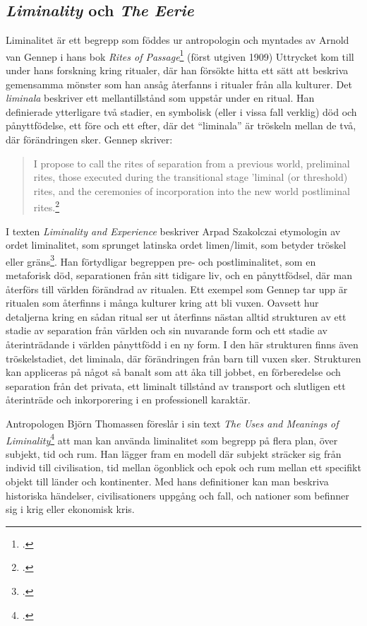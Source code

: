 \documentclass{article}
\begin{document}
\subsection{\emph{Liminality} och \emph{The Eerie}}
Liminalitet är ett begrepp som föddes ur antropologin och myntades av Arnold van Gennep i hans bok \emph{Rites
of Passage}\footcite{Gennep} (först utgiven 1909) Uttrycket kom till under hans forskning kring ritualer, där
han försökte hitta ett sätt att beskriva gemensamma mönster som han ansåg återfanns i ritualer från alla
kulturer. Det \emph{liminala} beskriver ett mellantillstånd som uppstår under en ritual. Han definierade ytterligare
två stadier, en symbolisk (eller i vissa fall verklig) död och pånyttfödelse, ett före och ett efter, där det
``liminala'' är tröskeln mellan de två, där förändringen sker. Gennep skriver:

\begin{quote}
I propose to call the rites of separation from a previous world, preliminal rites, those executed during the
transitional stage 'liminal (or threshold) rites, and the ceremonies of incorporation into the new world
	postliminal rites.\footcite[21]{Gennep}
\end{quote}


I texten \emph{Liminality and Experience} beskriver Arpad Szakolczai etymologin av ordet liminalitet, som
sprunget latinska ordet limen/limit, som betyder tröskel eller gräns\footcite[147-148]{Arpad}. 
Han förtydligar begreppen pre- och postliminalitet, som en metaforisk död, separationen från sitt tidigare
liv, och en pånyttfödsel, där man återförs till världen förändrad av ritualen. Ett exempel som Gennep tar upp
är ritualen som återfinns i många kulturer kring att bli vuxen. Oavsett hur detaljerna kring en sådan ritual
ser ut återfinns nästan alltid strukturen av ett stadie av separation från världen och sin nuvarande form och
ett stadie av återinträdande i världen pånyttfödd i en ny form. I den här strukturen finns även
tröskelstadiet, det liminala, där förändringen från barn till vuxen sker. Strukturen kan appliceras på något
så banalt som att åka till jobbet, en förberedelse och separation från det privata, ett liminalt tillstånd av
transport och slutligen ett återinträde och inkorporering i en professionell karaktär. 

Antropologen Björn Thomassen föreslår i sin text \emph{The Uses and Meanings of
Liminality}\footcite[12-13]{Thomassen} att man kan använda liminalitet som begrepp på flera plan, över
subjekt, tid och rum. Han lägger fram en modell där subjekt sträcker sig från individ till civilisation, tid
mellan ögonblick och epok och rum mellan ett specifikt objekt till länder och kontinenter. Med hans
definitioner kan man beskriva historiska händelser, civilisationers uppgång och fall, och nationer som
befinner sig i krig eller ekonomisk kris.
\end{document}

